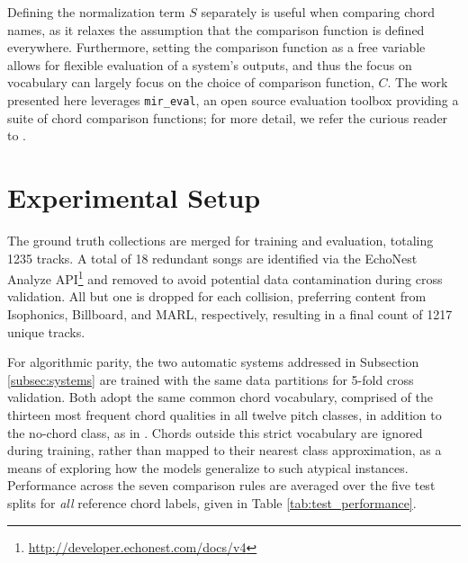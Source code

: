 \documentclass{article}
\begin{document}
Defining the normalization term $S$ separately is useful when comparing chord names, as it relaxes the assumption that the comparison function is defined everywhere.
Furthermore, setting the comparison function as a free variable allows for flexible evaluation of a system's outputs, and thus the focus on vocabulary can largely focus on the choice of comparison function, $C$.
The work presented here leverages \texttt{mir\_eval}, an open source evaluation toolbox providing a suite of chord comparison functions;
for more detail, we refer the curious reader to \cite{Raffel2014Eval}.


\section{Experimental Setup}
\label{sec:exp_setup}

The ground truth collections are merged for training and evaluation, totaling 1235 tracks.
A total of 18 redundant songs are identified via the EchoNest Analyze API\footnote{\url{http://developer.echonest.com/docs/v4}} and removed to avoid potential data contamination during cross validation.
All but one is dropped for each collision, preferring content from Isophonics, Billboard, and MARL, respectively, resulting in a final count of 1217 unique tracks.

For algorithmic parity, the two automatic systems addressed in Subsection \ref{subsec:systems} are trained with the same data partitions for 5-fold cross validation.
Both adopt the same common chord vocabulary, comprised of the thirteen most frequent chord qualities in all twelve pitch classes, in addition to the no-chord class, as in \cite{Cho2014Improved}.
Chords outside this strict vocabulary are ignored during training, rather than mapped to their nearest class approximation, as a means of exploring how the models generalize to such atypical instances.
Performance across the seven comparison rules are averaged over the five test splits for \emph{all} reference chord labels, given in Table \ref{tab:test_performance}.
\end{document}
